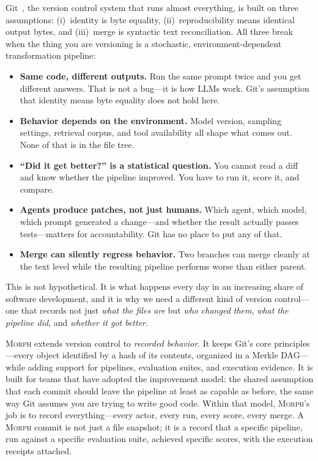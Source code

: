 \documentclass{article}
\begin{document}
Git~\citep{torvalds2005git}, the version control system that runs almost
everything, is built on three assumptions: (i)~identity is byte equality,
(ii)~reproducibility means identical output bytes, and (iii)~merge is syntactic
text reconciliation. All three break when the thing you are versioning is a
stochastic, environment-dependent transformation pipeline:

\begin{itemize}[nosep]
  \item \textbf{Same code, different outputs.} Run the same prompt twice and
    you get different answers. That is not a bug---it is how LLMs work. Git's
    assumption that identity means byte equality does not hold here.
  \item \textbf{Behavior depends on the environment.} Model version, sampling
    settings, retrieval corpus, and tool availability all shape what comes out.
    None of that is in the file tree.
  \item \textbf{``Did it get better?'' is a statistical question.} You cannot
    read a diff and know whether the pipeline improved. You have to run it,
    score it, and compare.
  \item \textbf{Agents produce patches, not just humans.} Which agent, which
    model, which prompt generated a change---and whether the result actually
    passes tests---matters for accountability. Git has no place to put any of
    that.
  \item \textbf{Merge can silently regress behavior.} Two branches can merge
    cleanly at the text level while the resulting pipeline performs worse than
    either parent.
\end{itemize}

\noindent This is not hypothetical. It is what happens every day in an
increasing share of software development, and it is why we need a different
kind of version control---one that records not just \emph{what the files are}
but \emph{who changed them}, \emph{what the pipeline did}, and \emph{whether it got better}.

\textsc{Morph} extends version control to \emph{recorded behavior}. It keeps
Git's core principles---every object identified by a hash of its contents,
organized in a Merkle DAG---while adding support for pipelines, evaluation
suites, and execution evidence. It is built for teams that have adopted the
improvement model: the shared assumption that each commit should leave the
pipeline at least as capable as before, the same way Git assumes you are
trying to write good code. Within that model, \textsc{Morph}'s job is to
record everything---every actor, every run, every score, every merge. A
\textsc{Morph} commit is not just a file snapshot; it is a record that a
specific pipeline, run against a specific evaluation suite, achieved specific
scores, with the execution receipts attached.
\end{document}
